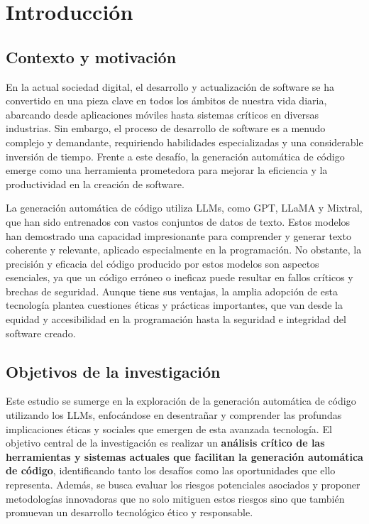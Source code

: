 \chapter{Introducción}
\label{chap:introduccion}

\section{Contexto y motivación}

\lettrine{E}{}n la actual sociedad digital, el desarrollo y actualización de software se ha convertido en una pieza clave en todos los ámbitos de nuestra vida diaria, abarcando desde aplicaciones móviles hasta sistemas críticos en diversas industrias. Sin embargo, el proceso de desarrollo de software es a menudo complejo y demandante, requiriendo habilidades especializadas y una considerable inversión de tiempo. Frente a este desafío, la generación automática de código emerge como una herramienta prometedora para mejorar la eficiencia y la productividad en la creación de software.

\bigskip %

La generación automática de código utiliza \acrlong{LLMs}, como \acrshort{GPT}, \acrshort{LLaMA} y Mixtral, que han sido entrenados con vastos conjuntos de datos de texto. Estos modelos han demostrado una capacidad impresionante para comprender y generar texto coherente y relevante, aplicado especialmente en la programación. No obstante, la precisión y eficacia del código producido por estos modelos son aspectos esenciales, ya que un código erróneo o ineficaz puede resultar en fallos críticos y brechas de seguridad. Aunque tiene sus ventajas, la amplia adopción de esta tecnología plantea cuestiones éticas y prácticas importantes, que van desde la equidad y accesibilidad en la programación hasta la seguridad e integridad del software creado.

\section{Objetivos de la investigación}

Este estudio se sumerge en la exploración de la generación automática de código utilizando los \acrfull{LLMs}, enfocándose en desentrañar y comprender las profundas implicaciones éticas y sociales que emergen de esta avanzada tecnología. El objetivo central de la investigación es realizar un \textbf{análisis crítico de las herramientas y sistemas actuales que facilitan la generación automática de código}, identificando tanto los desafíos como las oportunidades que ello representa. Además, se busca evaluar los riesgos potenciales asociados y proponer metodologías innovadoras que no solo mitiguen estos riesgos sino que también promuevan un desarrollo tecnológico ético y responsable.

